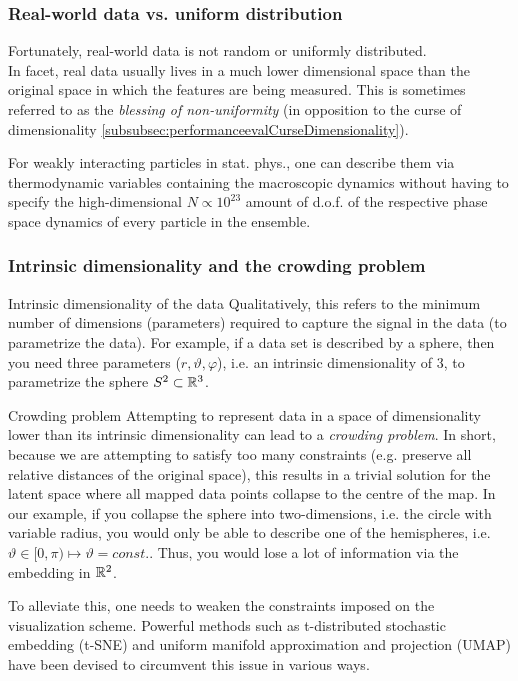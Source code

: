 \subsubsection{Real-world data vs. uniform distribution}
Fortunately, real-world data is not random or uniformly distributed.\\
In facet, real data usually lives in a much lower dimensional space than the original space in which the features are being measured. This is sometimes referred to as the \emph{blessing of non-uniformity} (in opposition to the curse of dimensionality \ref{subsubsec:performanceevalCurseDimensionality}). 
\begin{example}
	For weakly interacting particles in stat. phys., one can describe them via thermodynamic variables containing the macroscopic dynamics without having to specify the high-dimensional $N\propto 10^{23}$ amount of d.o.f. of the respective phase space dynamics of every particle in the ensemble.
\end{example}

\subsubsection{Intrinsic dimensionality and the crowding problem}
\begin{mybox}{Intrinsic dimensionality of the data}
	Qualitatively, this refers to the minimum number of dimensions (parameters) required to capture the signal in the data (to parametrize the data).  For example, if a data set is described by a sphere, then you need three parameters ($r,\vartheta,\varphi$), i.e. an intrinsic dimensionality of $3$, to parametrize the sphere $S^2 \subset \mathbb{R}^3$.
\end{mybox}
\begin{mybox}{Crowding problem}
	Attempting to represent data in a space of dimensionality lower than its intrinsic dimensionality can lead to a \emph{crowding problem}. In short, because we are attempting to satisfy too many constraints (e.g. preserve all relative distances of the original space), this results in a trivial solution for the latent space where all mapped data points collapse to the centre of the map. In our example, if you collapse the sphere into two-dimensions, i.e. the circle with variable radius, you would only be able to describe one of the hemispheres, i.e. $\vartheta\in [0,\pi)\mapsto \vartheta=const.$. Thus, you would lose a lot of information via the embedding in $\mathbb{R}^2$.
\end{mybox}
To alleviate this, one needs to weaken the constraints imposed on the visualization scheme. Powerful methods such as t-distributed stochastic embedding (t-SNE) and uniform manifold approximation and projection (UMAP) have been devised to circumvent this issue in various ways.


